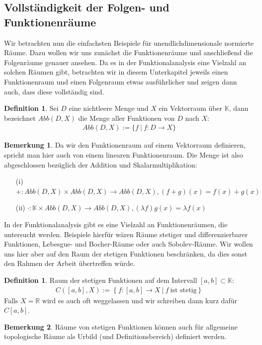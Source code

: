 \documentclass[10pt,a4paper]{article}
\theoremstyle{plain}
\theoremstyle{definition}
\newtheorem{definition}[satz]{Definition}
\newenvironment{dfi}{\begin{shaded}\begin{definition}}{\end{definition}\end{shaded}}
\theoremstyle{nonumberplain}
\newtheorem{bemerkung}{Bemerkung}
\newenvironment{bem}{\begin{bemerkung}}{\end{bemerkung}}
\newcommand{\R}{\mathbb{R}}
\newcommand{\K}{\mathbb{K}}
\begin{document}
\subsection{Vollständigkeit der Folgen- und Funktionenräume}
Wir betrachten nun die einfachsten Beispiele für unendlichdimensionale normierte Räume. Dazu wollen wir uns zunächst die Funktionenräume und anschließend die Folgenräume genauer ansehen. Da es in der Funktionalanalysis eine Vielzahl an solchen Räumen gibt, betrachten wir in diesem Unterkapitel jeweils einen Funktionenraum und einen Folgenraum etwas ausführlicher und zeigen dann auch, dass diese vollständig sind.
\begin{dfi}
Sei $D$ eine nichtleere Menge und $X$ ein Vektorraum über $\K$, dann bezeichnet $Abb(D,X)$ die Menge aller Funktionen von $D$ nach $X$:
\begin{align*}
Abb(D,X) := \{f \: | \: f : D \rightarrow X\}
\end{align*}
\end{dfi}
\begin{bem}
Da wir den Funktionenraum auf einem Vektorraum definieren, spricht man hier auch von einem linearen Funktionenraum. Die Menge ist also abgeschlossen bezüglich der Addition und Skalarmultiplikation:
\begin{itemize}
\item[(i)]  $+ : Abb(D,X) \times Abb(D,X) \rightarrow Abb(D,X), (f + g)(x) = f(x) + g(x)$\\
\item[(ii)]  $\cdot :  \K \times Abb(D,X) \rightarrow Abb(D,X), (\lambda f)g(x) = \lambda f(x)$
\end{itemize}
\end{bem}
In der Funktionalanalysis gibt es eine Vielzahl an Funktionenräumen, die untersucht werden. Beispiele hierfür wären Räume stetiger und differenzierbarer Funktionen,  Lebesgue- und Bocher-Räume oder auch Sobolev-Räume. Wir wollen uns hier aber auf den Raum der stetigen Funktionen beschränken, da dies sonst den Rahmen der Arbeit übertreffen würde.
\begin{dfi}
Raum der stetigen Funktionen auf dem Intervall $[a,b] \subset \K$:
\begin{align*}
C([a,b], X) := \left\{ f : [a,b] \rightarrow X \: | \: f \: \text{ist stetig} \right\}
\end{align*}
Falls $X = \R$ wird es auch oft weggelassen und wir schreiben dann kurz dafür $C[a,b]$.
\end{dfi}
\begin{bem}
Räume von stetigen Funktionen können auch für allgemeine topologische Räume als Urbild (und Definitionsbereich) definiert werden.
\end{bem}
\end{document}
